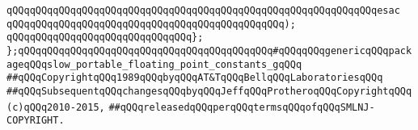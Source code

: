 \verb|qQQqqQQqqQQqqQQqqQQqqQQqqQQqqQQqqQQqqQQqqQQqqQQqqQQqqQQqqQQqqQQqesac|\newline
\verb|qQQqqQQqqQQqqQQqqQQqqQQqqQQqqQQqqQQqqQQqqQQqqQQq);|\newline
\verb|qQQqqQQqqQQqqQQqqQQqqQQqqQQqqQQq};|\newline
\newline
\verb|};qQQqqQQqqQQqqQQqqQQqqQQqqQQqqQQqqQQqqQQqqQQq#qQQqqQQqgenericqQQqpackageqQQqslow_portable_floating_point_constants_gqQQq|\newline
\newline
\newline
\newline
\verb|##qQQqCopyrightqQQq1989qQQqbyqQQqAT&TqQQqBellqQQqLaboratoriesqQQq|\newline
\verb|##qQQqSubsequentqQQqchangesqQQqbyqQQqJeffqQQqProtheroqQQqCopyrightqQQq(c)qQQq2010-2015,|\newline
\verb|##qQQqreleasedqQQqperqQQqtermsqQQqofqQQqSMLNJ-COPYRIGHT.|\newline

